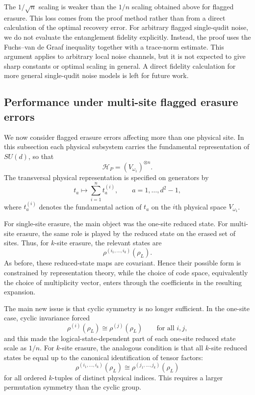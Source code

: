 \documentclass[10pt,twocolumn,superscriptaddress,aps,amsmath,amssymb,citeautoscript,floatfix,prx,longbibliography]{revtex4-2}
\theoremstyle{plain}
\theoremstyle{plain}
\theoremstyle{plain}
\theoremstyle{plain}
\theoremstyle{plain}
\theoremstyle{plain}
\begin{document}
The $1/\sqrt n$ scaling is weaker than the $1/n$ scaling obtained above for flagged erasure. This loss comes from the proof method rather than from a direct calculation of the optimal recovery error. For arbitrary flagged single-qudit noise, we do not evaluate the entanglement fidelity explicitly. Instead, the proof uses the Fuchs--van de Graaf inequality together with a trace-norm estimate. This argument applies to arbitrary local noise channels, but it is not expected to give sharp constants or optimal scaling in general. A direct fidelity calculation for more general single-qudit noise models is left for future work.

\subsection{Performance under multi-site flagged erasure errors}\label{subsec:main_muti_erasure_noise}

We now consider flagged erasure errors affecting more than one physical site. In this subsection each physical subsystem carries the fundamental representation of $SU(d)$, so that
$$
    \mathcal H_P=(V_{\omega_1})^{\otimes n}.
$$
The transversal physical representation is specified on generators by
$$
    t_a
    \longmapsto
    \sum_{i=1}^n t_a^{(i)},
    \qquad
    a=1,\ldots,d^2-1,
$$
where $t_a^{(i)}$ denotes the fundamental action of $t_a$ on the $i$th physical space $V_{\omega_1}$.

For single-site erasure, the main object was the one-site reduced state. For multi-site erasure, the same role is played by the reduced state on the erased set of sites. Thus, for $k$-site erasure, the relevant states are
$$
    \rho^{(i_1,\ldots,i_k)}(\rho_L).
$$
As before, these reduced-state maps are covariant. Hence their possible form is constrained by representation theory, while the choice of code space, equivalently the choice of multiplicity vector, enters through the coefficients in the resulting expansion.

The main new issue is that cyclic symmetry is no longer sufficient. In the one-site case, cyclic invariance forced
$$
    \rho^{(i)}(\rho_L)
    \cong
    \rho^{(j)}(\rho_L)
    \qquad
    \text{for all } i,j,
$$
and this made the logical-state-dependent part of each one-site reduced state scale as $1/n$. For $k$-site erasure, the analogous condition is that all $k$-site reduced states be equal up to the canonical identification of tensor factors:
$$
    \rho^{(i_1,\ldots,i_k)}(\rho_L)
    \cong
    \rho^{(j_1,\ldots,j_k)}(\rho_L)
$$
for all ordered $k$-tuples of distinct physical indices. This requires a larger permutation symmetry than the cyclic group.
\end{document}
